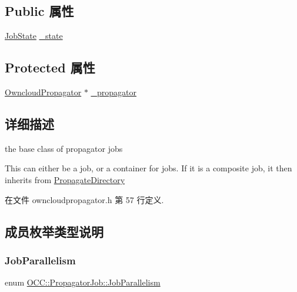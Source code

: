 \subsection*{Public 属性}
\begin{DoxyCompactItemize}
\item 
\hyperlink{class_o_c_c_1_1_propagator_job_afe241af4af083af8c00b0c88c921fa32}{Job\+State} \hyperlink{class_o_c_c_1_1_propagator_job_aea25494dc656a1185a8b9f1edff69668}{\+\_\+state}
\end{DoxyCompactItemize}
\subsection*{Protected 属性}
\begin{DoxyCompactItemize}
\item 
\hyperlink{class_o_c_c_1_1_owncloud_propagator}{Owncloud\+Propagator} $\ast$ \hyperlink{class_o_c_c_1_1_propagator_job_adcbb5f2a95f6370a5af6378ca2b8b67c}{\+\_\+propagator}
\end{DoxyCompactItemize}


\subsection{详细描述}
the base class of propagator jobs 

This can either be a job, or a container for jobs. If it is a composite job, it then inherits from \hyperlink{class_o_c_c_1_1_propagate_directory}{Propagate\+Directory} 

在文件 owncloudpropagator.\+h 第 57 行定义.



\subsection{成员枚举类型说明}
\mbox{\label{class_o_c_c_1_1_propagator_job_a2527eb0e2b598fc260a2d6449689c156}} 
\subsubsection{\texorpdfstring{Job\+Parallelism}{JobParallelism}}
{\footnotesize\ttfamily enum \hyperlink{class_o_c_c_1_1_propagator_job_a2527eb0e2b598fc260a2d6449689c156}{O\+C\+C\+::\+Propagator\+Job\+::\+Job\+Parallelism}}

